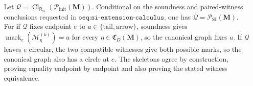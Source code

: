 Let \(\mathcal Q=\operatorname{Cl}_{\mathsf R_{\mathrm{SI}}}(\mathcal P_{\mathrm{init}}(\mathbf M))\).  Conditional on the soundness and paired-witness conclusions requested in \(\texttt{oeq:si-extension-calculus}\), one has \(\mathcal Q=\mathcal P_{\mathrm{SI}}(\mathbf M)\).  For if \(\mathcal Q\) fixes endpoint \(e\) to \(a\in\{\mathrm{tail},\mathrm{arrow}\}\), soundness gives \(\operatorname{mark}_e(\mathcal M_\eta^{(k)})=a\) for every \(\eta\in\mathfrak C_D(\mathbf M)\), so the canonical graph fixes \(a\).  If \(\mathcal Q\) leaves \(e\) circular, the two compatible witnesses give both possible marks, so the canonical graph also has a circle at \(e\).  The skeletons agree by construction, proving equality endpoint by endpoint and also proving the stated witness equivalence.